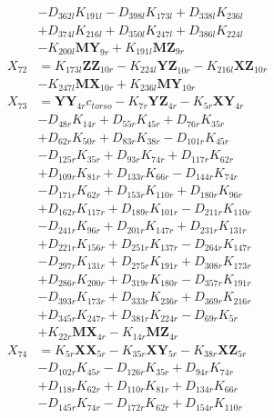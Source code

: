 \begin{multicols}{2}
\begin{align}
&- D_{362l}K_{191l} - D_{398l}K_{173l} + D_{338l}K_{236l}  \nonumber \\
&+ D_{374l}K_{216l} + D_{350l}K_{247l} + D_{386l}K_{224l}  \nonumber \\
&- K_{200l}\mathbf{MY}_{9r} + K_{191l}\mathbf{MZ}_{9r} \nonumber \\
X_{72} &= K_{173l}\mathbf{ZZ}_{10r} - K_{224l}\mathbf{YZ}_{10r} - K_{216l}\mathbf{XZ}_{10r}  \nonumber \\
&- K_{247l}\mathbf{MX}_{10r} + K_{236l}\mathbf{MY}_{10r} \nonumber \\
X_{73} &= \mathbf{YY}_{4r}c_{torso} - K_{7r}\mathbf{YZ}_{4r} - K_{5r}\mathbf{XY}_{4r}  \nonumber \\
&- D_{48r}K_{14r} + D_{55r}K_{45r} + D_{76r}K_{35r}  \nonumber \\
&+ D_{62r}K_{50r} + D_{83r}K_{38r} - D_{101r}K_{45r}  \nonumber \\
&- D_{125r}K_{35r} + D_{93r}K_{74r} + D_{117r}K_{62r}  \nonumber \\
&+ D_{109r}K_{81r} + D_{133r}K_{66r} - D_{144r}K_{74r}  \nonumber \\
&- D_{171r}K_{62r} + D_{153r}K_{110r} + D_{180r}K_{96r}  \nonumber \\
&+ D_{162r}K_{117r} + D_{189r}K_{101r} - D_{211r}K_{110r}  \nonumber \\
&- D_{241r}K_{96r} + D_{201r}K_{147r} + D_{231r}K_{131r}  \nonumber \\
&+ D_{221r}K_{156r} + D_{251r}K_{137r} - D_{264r}K_{147r}  \nonumber \\
&- D_{297r}K_{131r} + D_{275r}K_{191r} + D_{308r}K_{173r}  \nonumber \\
&+ D_{286r}K_{200r} + D_{319r}K_{180r} - D_{357r}K_{191r}  \nonumber \\
&- D_{393r}K_{173r} + D_{333r}K_{236r} + D_{369r}K_{216r}  \nonumber \\
&+ D_{345r}K_{247r} + D_{381r}K_{224r} - D_{69r}K_{5r}  \nonumber \\
&+ K_{22r}\mathbf{MX}_{4r} - K_{14r}\mathbf{MZ}_{4r} \nonumber \\
X_{74} &= K_{5r}\mathbf{XX}_{5r} - K_{35r}\mathbf{XY}_{5r} - K_{38r}\mathbf{XZ}_{5r}  \nonumber \\
&- D_{102r}K_{45r} - D_{126r}K_{35r} + D_{94r}K_{74r}  \nonumber \\
&+ D_{118r}K_{62r} + D_{110r}K_{81r} + D_{134r}K_{66r}  \nonumber \\
&- D_{145r}K_{74r} - D_{172r}K_{62r} + D_{154r}K_{110r}  \nonumber \\

\end{align}
\end{multicols}
